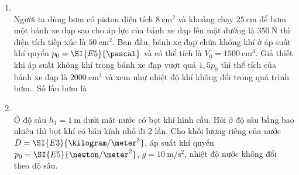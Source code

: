 \begin{enumerate}[label=\bfseries Câu \arabic*:, leftmargin=1.7cm]
\item{}\\
Người ta dùng bơm có piston diện tích $\SI{8}{\centi\meter^2}$ và khoảng chạy $\SI{25}{\centi\meter}$ để bơm một bánh xe đạp sao cho áp lực của bánh xe đạp lên mặt đường là $\SI{350}{\newton}$ thì diện tích tiếp xúc là $\SI{50}{\centi\meter^2}$. Ban đầu, bánh xe đạp chứa không khí ở áp suất khí quyển $p_0=\SI{E5}{\pascal}$ và có thể tích là $V_0=\SI{1500}{\centi\meter^3}$. Giả thiết khi áp suất không khí trong bánh xe đạp vượt quá $1,5p_0$ thì thể tích của bánh xe đạp là $\SI{2000}{\centi\meter^3}$ và xem như nhiệt độ khí không đổi trong quá trình bơm.. Số lần bơm là

\item {}\\
Ở độ sâu $h_1=\SI{1}{\meter}$ dưới mặt nước có bọt khí hình cầu. Hỏi ở độ sâu bằng bao nhiêu thì bọt khí có bán kính nhỏ đi 2 lần. Cho khối lượng riêng của nước $D=\SI{E3}{\kilogram/\meter^3}$, áp suất khí quyển $p_0=\SI{E5}{\newton/\meter^2}$, $g=\SI{10}{\meter/\second^2}$, nhiệt độ nước không đổi theo độ sâu.


\end{enumerate}
